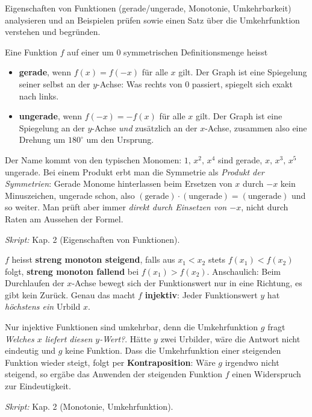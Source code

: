 

Eigenschaften von Funktionen (gerade/ungerade, Monotonie, Umkehrbarkeit)
analysieren und an Beispielen prüfen sowie einen Satz über die
Umkehrfunktion verstehen und begründen.

\begin{werkzeugkasten}
Eine Funktion $f$ auf einer um $0$ symmetrischen Definitionsmenge heisst
\begin{itemize}
  \item \textbf{gerade}, wenn $f(x)=f(-x)$ für alle $x$ gilt. Der Graph ist
        eine Spiegelung seiner selbst an der $y$-Achse: Was rechts von $0$
        passiert, spiegelt sich exakt nach links.
  \item \textbf{ungerade}, wenn $f(-x)=-f(x)$ für alle $x$ gilt. Der Graph
        ist eine Spiegelung an der $y$-Achse \emph{und} zusätzlich an der
        $x$-Achse, zusammen also eine Drehung um $180^\circ$ um den
        Ursprung.
\end{itemize}
Der Name kommt von den typischen Monomen: $1,\,x^2,\,x^4$ sind gerade,
$x,\,x^3,\,x^5$ ungerade. Bei einem Produkt erbt man die Symmetrie als \emph{Produkt der Symmetrien}:
Gerade Monome hinterlassen beim Ersetzen von
$x$ durch $-x$ kein Minuszeichen, ungerade schon, also
$(\text{gerade})\cdot(\text{ungerade})=(\text{ungerade})$ und so weiter.
Man prüft aber immer \emph{direkt durch Einsetzen von $-x$}, nicht durch
Raten am Aussehen der Formel.

\textit{Skript:} Kap. 2 (Eigenschaften von Funktionen).
\end{werkzeugkasten}

\begin{werkzeugkasten}
$f$ heisst \textbf{streng monoton steigend}, falls aus $x_1<x_2$ stets
$f(x_1)<f(x_2)$ folgt, \textbf{streng monoton fallend} bei
$f(x_1)>f(x_2)$. Anschaulich: Beim Durchlaufen der $x$-Achse bewegt sich
der Funktionswert nur in eine Richtung, es gibt kein Zurück. Genau das macht
$f$ \textbf{injektiv}: Jeder Funktionswert $y$ hat \emph{höchstens ein}
Urbild $x$.

Nur injektive Funktionen sind umkehrbar, denn die Umkehrfunktion $g$ fragt
\emph{Welches $x$ liefert diesen $y$-Wert?}. Hätte $y$ zwei Urbilder, wäre
die Antwort nicht eindeutig und $g$ keine Funktion. Dass die Umkehrfunktion
einer steigenden Funktion wieder steigt, folgt per \textbf{Kontraposition}:
Wäre $g$ irgendwo nicht steigend, so ergäbe das Anwenden der steigenden
Funktion $f$ einen Widerspruch zur Eindeutigkeit.

\textit{Skript:} Kap. 2 (Monotonie, Umkehrfunktion).
\end{werkzeugkasten}

